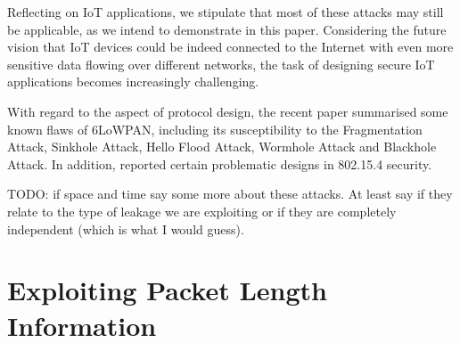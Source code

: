 \documentclass{article}
\begin{document}
Reflecting on IoT applications, we stipulate that most of these attacks may still be applicable, as we intend to demonstrate in this paper. Considering the future vision that IoT devices could be indeed connected to the Internet with even more sensitive data flowing over different networks, the task of designing secure IoT applications becomes increasingly challenging.

With regard to the aspect of protocol design, the recent paper \cite{6LoWPANAtk} summarised some known flaws of 6LoWPAN, including its susceptibility to the Fragmentation Attack\cite{FragAtk}, Sinkhole Attack\cite{Sinkhole}, Hello Flood Attack\cite{HelloFlood}, Wormhole Attack\cite{Wormhole} and Blackhole Attack\cite{Blackhole}. In addition, \cite{802154SecIssues} reported certain problematic designs in 802.15.4 security\cite{802154}.

TODO: if space and time say some more about these attacks. At least say if they relate to the type of leakage we are exploiting or if they are completely independent (which is what I would guess). 



%	





\section{Exploiting Packet Length Information}
\end{document}
